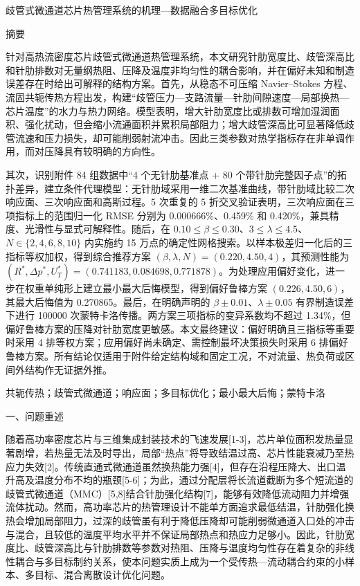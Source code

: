 \documentclass[12pt]{article}
\newcommand{\sect}[1]{\par\vspace{12pt}\noindent\begin{center}{\fontsize{14pt}{20pt}\selectfont\hei #1}\end{center}\vspace{4pt}}
\newcommand{\subsect}[1]{\par\vspace{6pt}\noindent{\fontsize{12pt}{17pt}\selectfont\hei #1}\par\vspace{2pt}}
\begin{document}
\begin{center}
  {\fontsize{16pt}{24pt}\selectfont\hei 歧管式微通道芯片热管理系统的机理—数据融合多目标优化}
\end{center}
\vspace{6pt}
\begin{center}{\fontsize{14pt}{20pt}\selectfont\hei 摘\quad 要}\end{center}

针对高热流密度芯片歧管式微通道热管理系统，本文研究针肋宽度比、歧管深高比和针肋排数对无量纲热阻、压降及温度非均匀性的耦合影响，并在偏好未知和制造误差存在时给出可解释的结构方案。首先，从稳态不可压缩 Navier--Stokes 方程、流固共轭传热方程出发，构建``歧管压力—支路流量—针肋间隙速度—局部换热—芯片温度''的水力与热力网络。模型表明，增大针肋宽度比或排数可增加湿润面积、强化扰动，但会缩小流通面积并累积局部阻力；增大歧管深高比可显著降低歧管流速和压力损失，却可能削弱射流冲击。因此三类参数对热学指标存在非单调作用，而对压降具有较明确的方向性。

其次，识别附件 84 组数据中``4 个无针肋基准点 + 80 个带针肋完整因子点''的拓扑差异，建立条件代理模型：无针肋域采用一维二次基准曲线，带针肋域比较二次响应面、三次响应面和高斯过程。5 次重复的 5 折交叉验证表明，三次响应面在三项指标上的范围归一化 RMSE 分别为 0.000666\%、0.459\% 和 0.420\%，兼具精度、光滑性与显式可解释性。随后，在 $0.10 \leq \beta \leq 0.30$、$3 \leq \lambda \leq 4.5$、$N \in \{2,4,6,8,10\}$ 内实施约 15 万点的确定性网格搜索。以样本极差归一化后的三指标等权加权，得到综合推荐方案 $(\beta,\lambda,N) = (0.220, 4.50, 4)$，其预测性能为 $(R^{*}, \Delta p^{*}, U_T^{*}) = (0.741183, 0.084698, 0.771878)$。为处理应用偏好变化，进一步在权重单纯形上建立最小最大后悔模型，得到偏好鲁棒方案 $(0.226, 4.50, 6)$，其最大后悔值为 0.270865。最后，在明确声明的 $\beta \pm 0.01$、$\lambda \pm 0.05$ 有界制造误差下进行 100000 次蒙特卡洛传播。两方案三项指标的变异系数均不超过 1.34\%，但偏好鲁棒方案的压降对针肋宽度更敏感。本文最终建议：偏好明确且三指标等重要时采用 4 排等权方案；应用偏好尚未确定、需控制最坏决策损失时采用 6 排偏好鲁棒方案。所有结论仅适用于附件给定结构域和固定工况，不对流量、热负荷或区间外结构作无证据外推。

共轭传热；歧管式微通道；响应面；多目标优化；最小最大后悔；蒙特卡洛

\sect{一、问题重述}
\subsect{1.1\quad 问题背景}
随着高功率密度芯片与三维集成封装技术的飞速发展[1-3]，芯片单位面积发热量显著剧增，若热量无法及时导出，局部``热点''将导致结温过高、芯片性能衰减乃至热应力失效[2]。传统直通式微通道虽然换热能力强[4]，但存在沿程压降大、出口温升高及温度分布不均的瓶颈[5-6]；为此，通过分配层将长流道截断为多个短流道的歧管式微通道（MMC）[5,8]结合针肋强化结构[7]，能够有效降低流动阻力并增强流体扰动。然而，高功率芯片的热管理设计不能单方面追求最低结温，针肋强化换热会增加局部阻力，过深的歧管虽有利于降低压降却可能削弱微通道入口处的冲击与混合，且较低的温度平均水平并不保证局部热点和热应力足够小。因此，针肋宽度比、歧管深高比与针肋排数等参数对热阻、压降与温度均匀性存在着复杂的非线性耦合与多目标制约关系，使本问题实质上成为一个受传热—流动耦合约束的小样本、多目标、混合离散设计优化问题。
\end{document}
